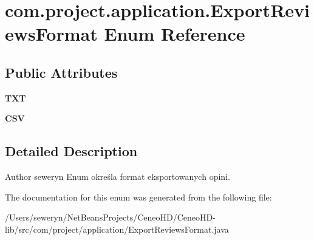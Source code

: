 \section{com.\+project.\+application.\+Export\+Reviews\+Format Enum Reference}
\label{enumcom_1_1project_1_1application_1_1_export_reviews_format}
\subsection*{Public Attributes}
\begin{DoxyCompactItemize}
\item 
\mbox{\label{enumcom_1_1project_1_1application_1_1_export_reviews_format_a4d2ad6a1843b5cffb661b2baf3017136}} 
{\bfseries T\+XT}
\item 
\mbox{\label{enumcom_1_1project_1_1application_1_1_export_reviews_format_aab38020e1b3526159f16422d5b34afe4}} 
{\bfseries C\+SV}
\end{DoxyCompactItemize}


\subsection{Detailed Description}
\begin{DoxyAuthor}{Author}
seweryn Enum określa format eksportowanych opini. 
\end{DoxyAuthor}


The documentation for this enum was generated from the following file\+:\begin{DoxyCompactItemize}
\item 
/\+Users/seweryn/\+Net\+Beans\+Projects/\+Ceneo\+H\+D/\+Ceneo\+H\+D-\/lib/src/com/project/application/Export\+Reviews\+Format.\+java\end{DoxyCompactItemize}
